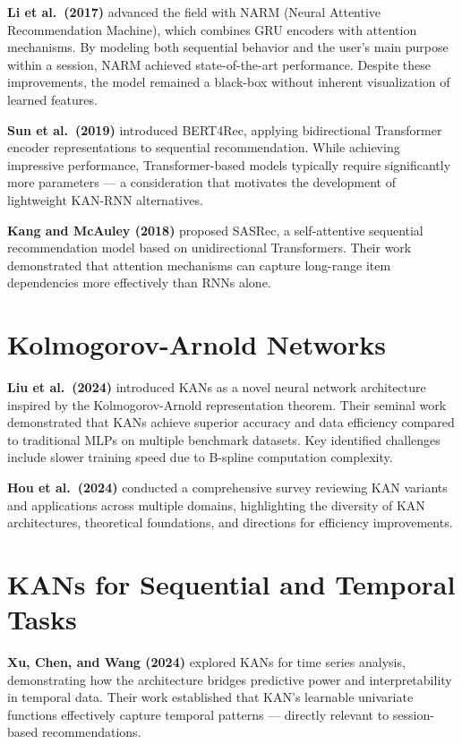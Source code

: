 \documentclass[12pt,a4paper]{report}
\begin{document}
\textbf{Li et al.\ (2017)} \cite{li2017} advanced the field with NARM (Neural
Attentive Recommendation Machine), which combines GRU encoders with attention
mechanisms. By modeling both sequential behavior and the user's main purpose
within a session, NARM achieved state-of-the-art performance. Despite these
improvements, the model remained a black-box without inherent visualization of
learned features.

\textbf{Sun et al.\ (2019)} \cite{sun2019} introduced BERT4Rec, applying
bidirectional Transformer encoder representations to sequential recommendation.
While achieving impressive performance, Transformer-based models typically require
significantly more parameters --- a consideration that motivates the development
of lightweight KAN-RNN alternatives.

\textbf{Kang and McAuley (2018)} \cite{kang2018} proposed SASRec, a
self-attentive sequential recommendation model based on unidirectional
Transformers. Their work demonstrated that attention mechanisms can capture
long-range item dependencies more effectively than RNNs alone.

\section{Kolmogorov-Arnold Networks}

\textbf{Liu et al.\ (2024)} \cite{liu2024} introduced KANs as a novel neural
network architecture inspired by the Kolmogorov-Arnold representation theorem.
Their seminal work demonstrated that KANs achieve superior accuracy and data
efficiency compared to traditional MLPs on multiple benchmark datasets. Key
identified challenges include slower training speed due to B-spline computation
complexity.

\textbf{Hou et al.\ (2024)} \cite{hou2024} conducted a comprehensive survey
reviewing KAN variants and applications across multiple domains, highlighting the
diversity of KAN architectures, theoretical foundations, and directions for
efficiency improvements.

\section{KANs for Sequential and Temporal Tasks}

\textbf{Xu, Chen, and Wang (2024)} \cite{xu2024kan} explored KANs for time
series analysis, demonstrating how the architecture bridges predictive power and
interpretability in temporal data. Their work established that KAN's learnable
univariate functions effectively capture temporal patterns --- directly relevant
to session-based recommendations.
\end{document}
